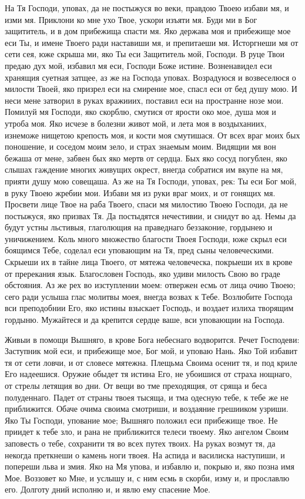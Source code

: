 На Тя Господи, уповах, да не постыжуся во веки, правдою Твоею избави мя, и изми мя. Приклони ко мне ухо Твое, ускори изъяти мя. Буди ми в Бог защититель, и в дом прибежища спасти мя. Яко держава моя и прибежище мое еси Ты, и имене Твоего ради наставиши мя, и препитаеши мя. Исторгнеши мя от сети сея, юже скрыша ми, яко Ты еси Защититель мой, Господи. В руце Твои предаю дух мой, избавил мя еси, Господи Боже истине. Возненавидел еси хранящия суетная затщее, аз же на Господа уповах. Возрадуюся и возвеселюся о милости Твоей, яко призрел еси на смирение мое, спасл еси от бед душу мою. И неси мене затворил в руках вражииих, поставил еси на пространне нозе мои. Помилуй мя Господи, яко скорблю, смутися от ярости око мое, душа моя и утроба моя. Яко исчезе в болезни живот мой, и лета моя в воздыханиих, изнеможе нищетою крепость моя, и кости моя смутишася. От всех враг моих бых поношение, и соседом моим зело, и страх знаемым моим. Видящии мя вон бежаша от мене, забвен бых яко мертв от сердца. Бых яко сосуд погублен, яко слышах гаждение многих живущих окрест, внегда собратися им вкупе на мя, прияти душу мою совещаша. Аз же на Тя Господи, уповах, рек: Ты еси Бог мой, в руку Твоею жребии мои. Избави мя из руки враг моих, и от гонящих мя. Просвети лице Твое на раба Твоего, спаси мя милостию Твоею Господи, да не постыжуся, яко призвах Тя. Да постыдятся нечестивии, и снидут во ад. Немы да будут устны льстивыя, глаголющия на праведнаго беззаконие, гордынею и уничижением. Коль много множество благости Твоея Господи, юже скрыл еси боящимся Тебе, соделал еси уповающим на Тя, пред сыны человеческими. Скрыеши их в тайне лица Твоего, от мятежа человеческа, покрыеши их в крове от пререкания язык. Благословен Господь, яко удиви милость Свою во граде обстояния. Аз же рех во изступлении моем: отвержен есмь от лица очию Твоею; сего ради услыша глас молитвы моея, внегда возвах к Тебе. Возлюбите Господа вси преподобнии Его, яко истины взыскает Господь, и воздает излиха творящим гордыню. Мужайтеся и да крепится сердце ваше, вси уповающии на Господа.




Живыи в помощи Вышняго, в крове Бога небеснаго водворится. Речет Господеви: Заступник мой еси, и прибежище мое, Бог мой, и уповаю Нань. Яко Той избавит тя от сети ловчи, и от словесе мятежна. Плещьма Своима осенит тя, и под криле Его надеешися. Оружие обыдет тя истина Его, не убоишися от страха нощнаго, от стрелы летящия во дни. От вещи во тме преходящия, от сряща и беса полуденнаго. Падет от страны твоея тысяща, и тма одесную тебе, к тебе же не приближится. Обаче очима своима смотриши, и воздаяние грешииком узриши. Яко Ты Господи, упование  мое; Вышняго положил еси прибежище твое. Не приидет к тебе зло, и рана не приближится телеси твоему. Яко ангелом Своим заповесть о тебе, сохранити тя во всех путех твоих. На руках возмут тя, да некогда преткнеши о камень ноги твоея. На аспида и василиска наступиши, и попереши льва и змия. Яко на Мя упова, и избавлю и, покрыю и, яко позна имя Мое. Воззовет ко Мне, и услышу и, с ним есмь в скорби, изму и, и прославлю его. Долготу дний исполню и, и явлю ему спасение Мое.


